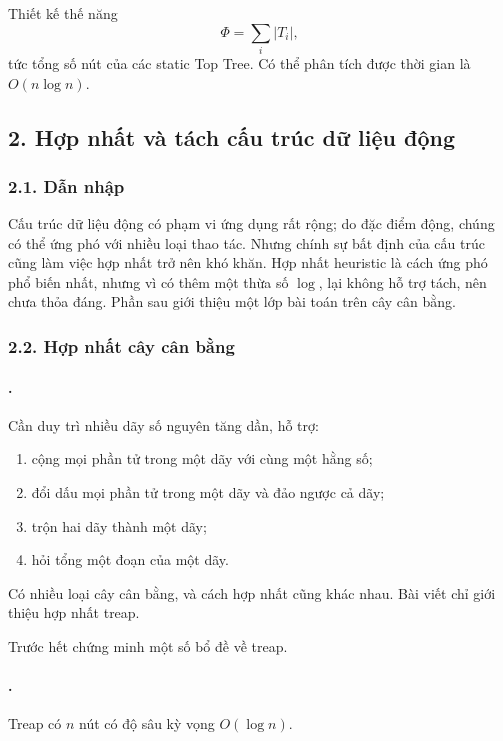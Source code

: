 \documentclass[11pt]{article}
\begin{document}
Thiết kế thế năng
\[
  \Phi=\sum_i |T_i|,
\]
tức tổng số nút của các static Top Tree. Có thể phân tích được thời gian là
\(O(n\log n)\).

\subsection*{2. Hợp nhất và tách cấu trúc dữ liệu động}

\subsubsection*{2.1. Dẫn nhập}

Cấu trúc dữ liệu động có phạm vi ứng dụng rất rộng; do đặc điểm động, chúng có
thể ứng phó với nhiều loại thao tác. Nhưng chính sự bất định của cấu trúc cũng
làm việc hợp nhất trở nên khó khăn. Hợp nhất heuristic là cách ứng phó phổ biến
nhất, nhưng vì có thêm một thừa số \(\log\), lại không hỗ trợ tách, nên chưa
thỏa đáng. Phần sau giới thiệu một lớp bài toán trên cây cân bằng.

\subsubsection*{2.2. Hợp nhất cây cân bằng}

\paragraph{.}
Cần duy trì nhiều dãy số nguyên tăng dần, hỗ trợ:
\begin{enumerate}
  \item cộng mọi phần tử trong một dãy với cùng một hằng số;
  \item đổi dấu mọi phần tử trong một dãy và đảo ngược cả dãy;
  \item trộn hai dãy thành một dãy;
  \item hỏi tổng một đoạn của một dãy.
\end{enumerate}

Có nhiều loại cây cân bằng, và cách hợp nhất cũng khác nhau. Bài viết chỉ giới
thiệu hợp nhất treap.

Trước hết chứng minh một số bổ đề về treap.

\paragraph{.}
Treap có \(n\) nút có độ sâu kỳ vọng \(O(\log n)\).
\end{document}
